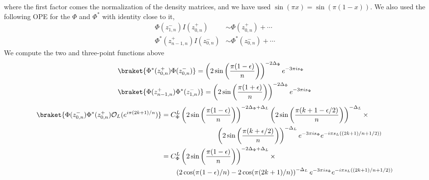 \documentclass[11pt]{article}
\newcommand{\ep}{\epsilon}
\newcommand{\p}{\partial}
\newcommand{\mO}{\mathcal{O}}
\newcommand{\nn}{\nonumber}
\newcommand{\lb}{\left(}
\newcommand{\rb}{\right)}
\begin{document}
where the first factor comes the normalization of the density matrices, and we have used $\sin(\pi x)=\sin(\pi(1-x))$. We also used the following OPE for the $\Phi$ and $\Phi^*$ with identity close to it,
\begin{align}
    \Phi(z_{1,n}^-) I(z_{0,n}^+) &\sim \Phi(z_{0,n}^+) + \cdots 
    \nn\\
    \Phi^*(z_{n-1,n}^+)I(z_{0,n}^-) &\sim \Phi^*(z_{0,n}^-)+ \cdots 
\end{align}
We compute the two and three-point functions above \
\begin{align}
 &\braket{\Phi^*(z^+_{0,n})\Phi(z^-_{0,n})}=\lb 2\sin\lb\frac{\pi(1-\ep)}{n}\rb\rb^{-2\Delta_\Phi}e^{-3\pi i s_\Phi}\\
  &\braket{\Phi(z^+_{n-1,n})\Phi^*(z^-_{1,n})}=\lb 2\sin\lb\frac{\pi(1+\ep)}{n}\rb\rb^{-2\Delta_\Phi}e^{-3\pi i s_\Phi}
\end{align}
\begin{align}
\braket{\Phi(z^-_{0,n})\Phi^*(z^+_{0,n})\mO_L(e^{i\pi(2k+1) /n})}&=C_\Phi^L\lb 2\sin\lb\frac{\pi(1-\ep)}{n}\rb\rb^{-2\Delta_\Phi+\Delta_L}\lb 2\sin\lb\frac{\pi(k+1-\ep/2)}{n}\rb\rb^{-\Delta_L}\times\nn\\
&\qquad \qquad \qquad \qquad\lb 2\sin\lb\frac{\pi(k+\ep/2)}{n}\rb\rb^{-\Delta_L}e^{-3\pi i s_\Phi}e^{-i\pi s_L\lb (2k+1)/n+1/2)\rb}\nn\\
&=C_\Phi^L\lb 2\sin\lb\frac{\pi(1-\ep)}{n}\rb\rb^{-2\Delta_\Phi+\Delta_L}\times\nn \\
&\qquad\lb2\cos(\pi(1-\ep)/n)-2\cos(\pi (2k+1)/n) \rb^{-\Delta_L}e^{-3\pi i s_\Phi}e^{-i\pi s_L\lb (2k+1)/n+1/2)\rb}
\end{align}
\end{document}
